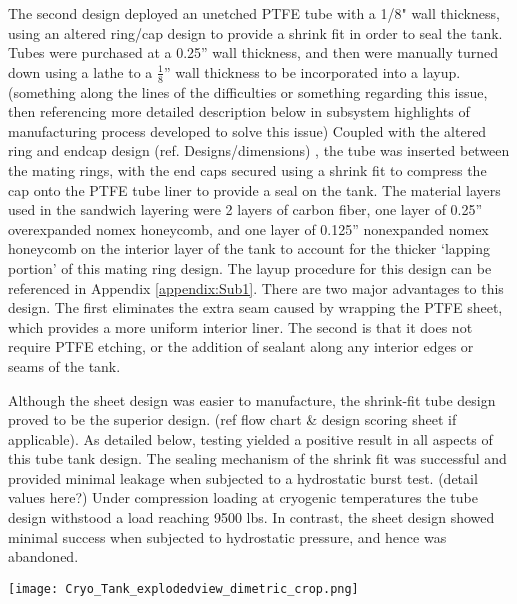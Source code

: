 	The second design deployed an unetched PTFE tube with a 1/8" wall thickness, using an altered ring/cap design to provide a shrink fit in order to seal the tank. Tubes were purchased at a 0.25” wall thickness, and then were manually turned down using a lathe to a $\frac{1}{8}$”  wall thickness to be incorporated into a layup.  (something along the lines of the difficulties or something regarding this issue, then referencing more detailed description below in subsystem highlights of manufacturing process developed to solve this issue) Coupled with the altered ring and endcap design (ref. Designs/dimensions) , the tube was inserted between the mating rings, with the end caps secured using a shrink fit to compress the cap onto the PTFE tube liner to provide a seal on the tank.  The material layers used in the sandwich layering were 2 layers of carbon fiber, one layer of 0.25” overexpanded nomex honeycomb, and one layer of 0.125” nonexpanded nomex honeycomb on the interior layer of the tank to account for the thicker ‘lapping portion’ of this mating ring design.  The layup procedure for this design can be referenced in Appendix \ref{appendix:Sub1}.
	There are two major advantages to this design. The first eliminates the extra seam caused by wrapping the PTFE sheet, which provides a more uniform interior liner. The second is that it does not require PTFE etching, or the addition of sealant along any interior edges or seams of the tank.

    Although the sheet design was easier to manufacture, the shrink-fit tube design proved to be the superior design.  (ref flow chart & design scoring sheet if applicable).  As detailed below, testing yielded a positive result in all aspects of this tube tank design.  The sealing mechanism of the shrink fit was successful and provided minimal leakage when subjected to a hydrostatic burst test. (detail values here?)  Under compression loading at cryogenic temperatures the tube design withstood a load reaching 9500 lbs.  In contrast, the sheet design showed minimal success when subjected to hydrostatic pressure, and hence was abandoned.
    
    
    \begin{center}
    \centering
    \texttt{[image: Cryo\_Tank\_explodedview\_dimetric\_crop.png]}
    \label{fig:ExploadedView}
\end{center}
\newpage